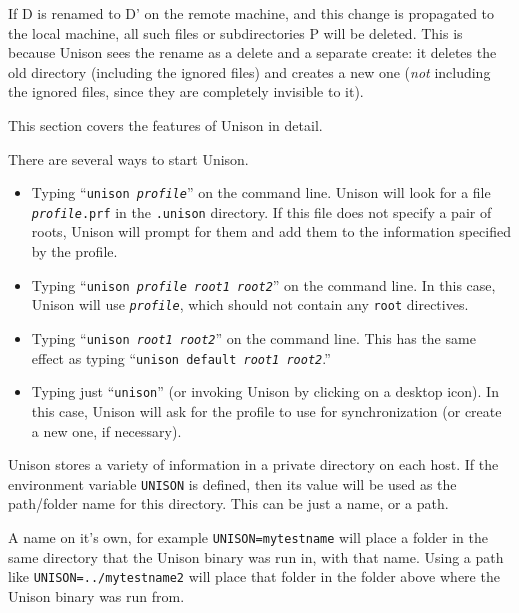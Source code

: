 \documentclass{article}
\newcommand{\NT}[1]{\textit{#1}}
\begin{document}
\begin{itemize}
 If D is renamed to D' on the remote machine, and this change is
 propagated to the local machine, all such files or subdirectories P
 will be deleted.  This is because Unison sees the rename as a delete and a
 separate create: it deletes the old directory (including the ignored files)
 and creates a new one ({\em not} including the ignored files, since they
 are completely invisible to it).
\end{itemize}




This section covers the features of Unison in detail.


There are several ways to start Unison.
\begin{itemize}
\item Typing ``{\tt unison \NT{profile}}'' on the command line.  Unison
will look for a file \texttt{\NT{profile}.prf} in the \verb|.unison|
directory.  If this file does not specify a pair of roots, Unison will
prompt for them and add them to the information specified by the profile.
\item Typing ``{\tt unison \NT{profile} \NT{root1} \NT{root2}}'' on the command
line.
In this case, Unison will use {\tt \NT{profile}}, which should not contain
any {\tt root} directives.
\item Typing ``{\tt unison \NT{root1} \NT{root2}}'' on the command line.  This
has the same effect as typing ``{\tt unison default \NT{root1} \NT{root2}}.''
\item Typing just ``{\tt unison}'' (or invoking Unison by clicking on
a desktop icon).  In this case, Unison will ask for the profile to use
for synchronization (or create a new one, if necessary).
\end{itemize}



Unison stores a variety of information in a private directory on each
host.  If the environment variable {\tt UNISON} is defined, then its
value will be used as the path/folder name for this directory.
This can be just a name, or a path.

A name on it's own, for example {\tt UNISON=mytestname} will
place a folder in the same directory that the Unison binary was run
in, with that name. Using a path like {\tt UNISON=../mytestname2}
will place that folder in the folder above where the Unison binary was
run from.
\end{document}
